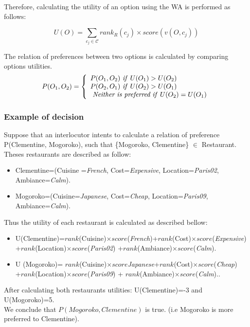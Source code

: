 \documentclass{llncs}
\begin{document}
Therefore, calculating the utility of an option using the WA is performed as follows: 

 \[U(O) = \sum_{c_j \in \mathcal{C}}  rank_R(c_j) \times score\left( v(O, c_j) \right) \] 
 
 
 \par The relation of preferences between two options is calculated by comparing  options utilities. 
  \[ P(O_1, O_2)  = \left \{
    \begin{array}{l}
	P(O_1, O_2)$ \textit{if}  $U(O_1) > U(O_2) \\
	P(O_2, O_1)$  \textit{if}  $U(O_2) > U(O_1) \\
	$  \textit{Neither is preferred if}  $U(O_2) = U(O_1)\\
    \end{array}
    \right .\]
 
\subsubsection{Example of decision}

Suppose that an interlocutor intents to calculate a relation of preference  P(Clementine, Mogoroko), such that 
\{Mogoroko, Clementine\} $\in$ Restaurant. Theses restaurants are described as follow: 
\begin{itemize}
\item Clementine=(Cuisine =\textit{French}, Cost=\textit{Expensive}, Location=\textit{Paris02},
 \\Ambiance=\textit{Calm}).
\item Mogoroko=(Cuisine=\textit{Japanese}, Cost=\textit{Cheap}, Location=\textit{Paris09}, 
\\Ambiance=\textit{Calm}).
\end{itemize}

Thus the utility of each restaurant is calculated as described bellow: 
\begin{itemize}
\item U(Clementine)=$rank$(Cuisine)$\times score$(\textit{French})+$rank$(Cost)$\times score$(\textit{Expensive})\\+$rank$(Location)$\times score$(\textit{Paris02})
+$rank$(Ambiance)$\times score$(\textit{Calm}).
\item U (Mogoroko)= $rank$(Cuisine)$\times score$\textit{Japanese}+$rank$(Cost)$\times score$(\textit{Cheap})\\+$rank$(Location)$\times score$(\textit{Paris09}) +  
$rank$(Ambiance)$\times score$(\textit{Calm})..
\end{itemize}
After calculating both restaurants utilities: U(Clementine)=-3 and U(Mogoroko)=5.
\\  We conclude that $P(Mogoroko, Clementine)$ is true.
 (i.e Mogoroko is more preferred to Clementine).
\end{document}
